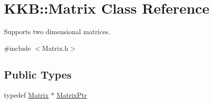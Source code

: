 \hypertarget{class_k_k_b_1_1_matrix}{}\section{K\+KB\+:\+:Matrix Class Reference}
\label{class_k_k_b_1_1_matrix}


Supports two dimensional matrices.  




{\ttfamily \#include $<$Matrix.\+h$>$}

\subsection*{Public Types}
\begin{DoxyCompactItemize}
\item 
typedef \hyperlink{class_k_k_b_1_1_matrix}{Matrix} $\ast$ \hyperlink{class_k_k_b_1_1_matrix_ad532bd6e9d0aa9b54e78f0feec5741a3}{Matrix\+Ptr}
\end{DoxyCompactItemize}

